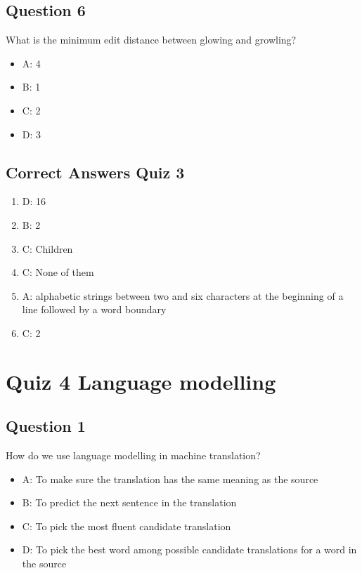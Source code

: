 \documentclass[
  11pt,
  british,
]{article}
\providecommand{\tightlist}{%
  \setlength{\itemsep}{0pt}\setlength{\parskip}{0pt}}
\begin{document}
\hypertarget{question-6-2}{%
\subsection{Question 6}\label{question-6-2}}

What is the minimum edit distance between glowing and growling?

\begin{itemize}
\tightlist
\item
  A: 4
\item
  B: 1
\item
  C: 2
\item
  D: 3
\end{itemize}

\hypertarget{correct-answers-quiz-3}{%
\subsection{Correct Answers Quiz 3}\label{correct-answers-quiz-3}}

\begin{enumerate}
\def\labelenumi{\arabic{enumi}.}
\tightlist
\item
  D: 16
\item
  B: 2
\item
  C: Children
\item
  C: None of them
\item
  A: alphabetic strings between two and six characters at the beginning
  of a line followed by a word boundary
\item
  C: 2
\end{enumerate}

\hypertarget{quiz-4-language-modelling}{%
\section{Quiz 4 Language modelling}\label{quiz-4-language-modelling}}

\hypertarget{question-1-3}{%
\subsection{Question 1}\label{question-1-3}}

How do we use language modelling in machine translation?

\begin{itemize}
\tightlist
\item
  A: To make sure the translation has the same meaning as the source
\item
  B: To predict the next sentence in the translation
\item
  C: To pick the most fluent candidate translation\\
\item
  D: To pick the best word among possible candidate translations for a
  word in the source
\end{itemize}
\end{document}
